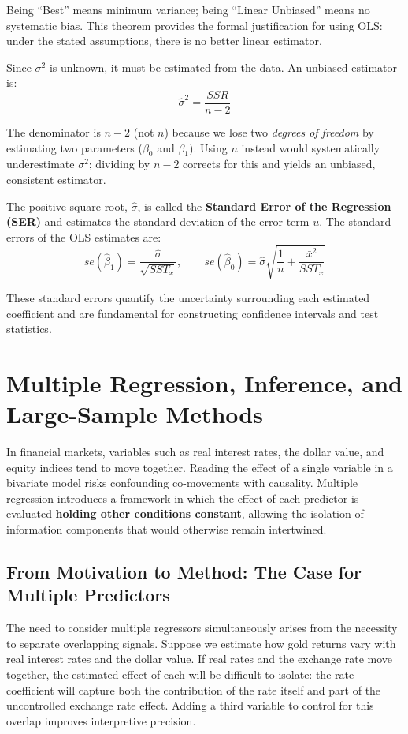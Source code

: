 Being ``Best'' means minimum variance; being ``Linear Unbiased'' means no systematic bias. This theorem provides the formal justification for using OLS: under the stated assumptions, there is no better linear estimator.

Since $\sigma^2$ is unknown, it must be estimated from the data. An unbiased estimator is:
$$\hat{\sigma}^2 = \frac{SSR}{n - 2}$$

The denominator is $n - 2$ (not $n$) because we lose two \emph{degrees of freedom} by estimating two parameters ($\beta_0$ and $\beta_1$). Using $n$ instead would systematically underestimate $\sigma^2$; dividing by $n - 2$ corrects for this and yields an unbiased, consistent estimator.

The positive square root, $\hat{\sigma}$, is called the \textbf{Standard Error of the Regression (SER)} and estimates the standard deviation of the error term $u$. The standard errors of the OLS estimates are:
$$se(\hat{\beta}_1) = \frac{\hat{\sigma}}{\sqrt{SST_x}}, \qquad se(\hat{\beta}_0) = \hat{\sigma}\sqrt{\frac{1}{n} + \frac{\bar{x}^2}{SST_x}}$$

These standard errors quantify the uncertainty surrounding each estimated coefficient and are fundamental for constructing confidence intervals and test statistics.


\section{Multiple Regression, Inference, and Large-Sample Methods}

In financial markets, variables such as real interest rates, the dollar value, and equity indices tend to move together. Reading the effect of a single variable in a bivariate model risks confounding co-movements with causality. Multiple regression introduces a framework in which the effect of each predictor is evaluated \textbf{holding other conditions constant}, allowing the isolation of information components that would otherwise remain intertwined.
\subsection{From Motivation to Method: The Case for Multiple Predictors}

The need to consider multiple regressors simultaneously arises from the necessity to separate overlapping signals. Suppose we estimate how gold returns vary with real interest rates and the dollar value. If real rates and the exchange rate move together, the estimated effect of each will be difficult to isolate: the rate coefficient will capture both the contribution of the rate itself and part of the uncontrolled exchange rate effect. Adding a third variable to control for this overlap improves interpretive precision.

